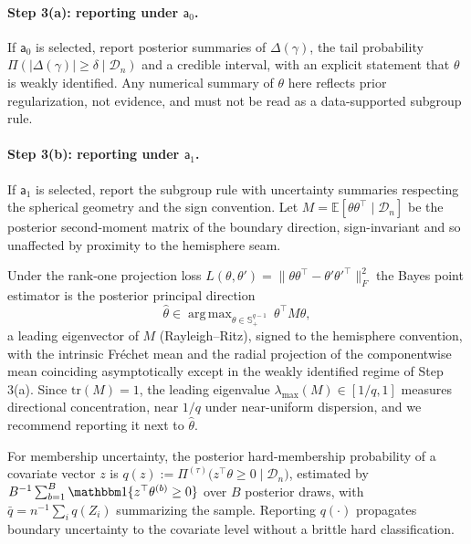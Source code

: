 \documentclass[11pt]{article}
\theoremstyle{definition}
\theoremstyle{plain}
\newcommand{\E}{\mathbb{E}}
\DeclareMathOperator*{\argmax}{arg\,max}
\begin{document}
\paragraph{Step 3(a): reporting under $\mathsf{a}_0$.}
If $\mathsf{a}_0$ is selected, report posterior summaries of $\Delta(\gamma)$, the tail probability $\Pi(|\Delta(\gamma)|\ge\delta\mid\mathcal D_n)$ and a credible interval, with an explicit statement that $\theta$ is weakly identified. Any numerical summary of $\theta$ here reflects prior regularization, not evidence, and must not be read as a data-supported subgroup rule.

\paragraph{Step 3(b): reporting under $\mathsf{a}_1$.}
If $\mathsf{a}_1$ is selected, report the subgroup rule with uncertainty summaries respecting the spherical geometry and the sign convention. Let $M=\E[\theta\theta^\top\mid\mathcal D_n]$ be the posterior second-moment matrix of the boundary direction, sign-invariant and so unaffected by proximity to the hemisphere seam.

Under the rank-one projection loss $L(\theta,\theta')=\|\theta\theta^\top-\theta'\theta'^\top\|_F^2$ the Bayes point estimator is the posterior principal direction
\begin{equation}
\label{eq:posterior_principal_direction}
    \hat\theta \in \argmax_{\theta\in\mathbb S^{q-1}_+}\ \theta^\top M\theta,
\end{equation}
a leading eigenvector of $M$ (Rayleigh--Ritz), signed to the hemisphere convention, with the intrinsic Fr\'echet mean \citep{BhattacharyaPatrangenaru2003} and the radial projection of the componentwise mean coinciding asymptotically except in the weakly identified regime of Step 3(a). Since $\mathrm{tr}(M)=1$, the leading eigenvalue $\lambda_{\max}(M)\in[1/q,1]$ measures directional concentration, near $1/q$ under near-uniform dispersion, and we recommend reporting it next to $\hat\theta$.

For membership uncertainty, the posterior hard-membership probability of a covariate vector $z$ is $q(z):=\Pi^{(\tau)}\big(z^\top\theta\ge 0\mid\mathcal D_n\big)$, estimated by $B^{-1}\sum_{b=1}^B\mathbbm 1\{z^\top\theta^{(b)}\ge0\}$ over $B$ posterior draws, with $\bar q=n^{-1}\sum_iq(Z_i)$ summarizing the sample. Reporting $q(\cdot)$ propagates boundary uncertainty to the covariate level without a brittle hard classification.
\end{document}
